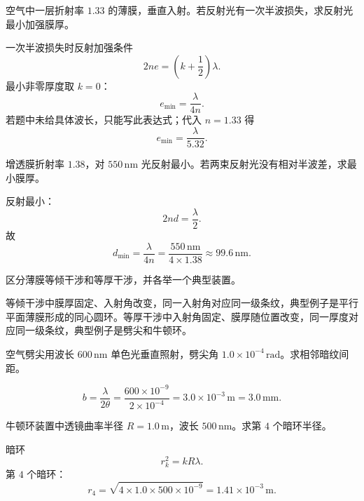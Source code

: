 \begin{exercise}[level=standard]
空气中一层折射率 $1.33$ 的薄膜，垂直入射。若反射光有一次半波损失，求反射光最小加强膜厚。
\begin{solution}
一次半波损失时反射加强条件
\[
  2ne=\left(k+\frac12\right)\lambda.
\]
最小非零厚度取 $k=0$：
\[
  e_{\min}=\frac{\lambda}{4n}.
\]
若题中未给具体波长，只能写此表达式；代入 $n=1.33$ 得
\[
  e_{\min}=\frac{\lambda}{5.32}.
\]
\end{solution}
\end{exercise}

\begin{exercise}[level=standard]
增透膜折射率 $1.38$，对 $550\,\mathrm{nm}$ 光反射最小。若两束反射光没有相对半波差，求最小膜厚。
\begin{solution}
反射最小：
\[
  2nd=\frac{\lambda}{2}.
\]
故
\[
  d_{\min}=\frac{\lambda}{4n}
  =\frac{550\,\mathrm{nm}}{4\times1.38}
  \approx99.6\,\mathrm{nm}.
\]
\end{solution}
\end{exercise}

\begin{exercise}[level=basic]
区分薄膜等倾干涉和等厚干涉，并各举一个典型装置。
\begin{solution}
等倾干涉中膜厚固定、入射角改变，同一入射角对应同一级条纹，典型例子是平行平面薄膜形成的同心圆环。等厚干涉中入射角固定、膜厚随位置改变，同一厚度对应同一级条纹，典型例子是劈尖和牛顿环。
\end{solution}
\end{exercise}

\begin{exercise}[level=standard]
空气劈尖用波长 $600\,\mathrm{nm}$ 单色光垂直照射，劈尖角 $1.0\times10^{-4}\,\mathrm{rad}$。求相邻暗纹间距。
\begin{solution}
\[
  b=\frac{\lambda}{2\theta}
  =\frac{600\times10^{-9}}{2\times10^{-4}}
  =3.0\times10^{-3}\,\mathrm{m}=3.0\,\mathrm{mm}.
\]
\end{solution}
\end{exercise}

\begin{exercise}[level=standard]
牛顿环装置中透镜曲率半径 $R=1.0\,\mathrm{m}$，波长 $500\,\mathrm{nm}$。求第 $4$ 个暗环半径。
\begin{solution}
暗环
\[
  r_k^2=kR\lambda.
\]
第 $4$ 个暗环：
\[
  r_4=\sqrt{4\times1.0\times500\times10^{-9}}
  =1.41\times10^{-3}\,\mathrm{m}.
\]
\end{solution}
\end{exercise}

